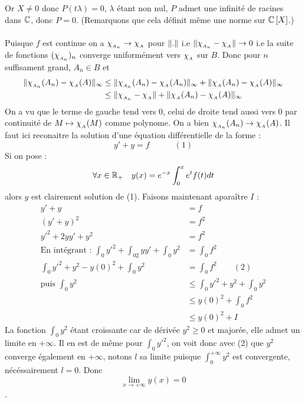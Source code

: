 \documentclass[letterpaper,10pt]{article}
\begin{document}
{Or $X \neq 0$ donc $P(t\lambda) =0$, $\lambda$ étant non nul, $P$ admet une infinité de racines dans $\mathbb{C}$, donc $P=0$. (Remarquons que cela définit même une norme sur $\mathbb{C}\left[X\right] $.)\\
\\
Puisque $f$ est continue on a $\chi_{_{A_n}} \to \chi_{_{A}}$ pour $\|.\|$ i.e $\|\chi_{_{A_n}}-\chi_{_{A}}\| \to 0$ i.e la suite de fonctions $(\chi_{_{A_n}})_n$ converge uniformément vers $\chi_{_{A}}$ sur $B$. Donc pour $n$ suffisament grand, $A_n\in B $ et \begin{align*}\|\chi_{_{A_n}}(A_n)-\chi_{_{A}}(A)\|_{\infty} &\leq \|\chi_{_{A_n}}(A_n)-\chi_{_{A}}(A_n)\|_{\infty} + \|\chi_{_{A}}(A_n)-\chi_{_{A}}(A)\|_{\infty}\\ &\leq \|\chi_{_{A_n}}-\chi_{_{A}}\| + \|\chi_{_{A}}(A_n)-\chi_{_{A}}(A)\|_{\infty} \end{align*}
On a vu que le terme de gauche tend vers 0, celui de droite tend aussi vers 0 par continuité de $M\mapsto \chi_{_{A}}(M)$ comme polynome.
On a bien $\chi_{_{A_n}}(A_n) \to \chi_{_{A}}(A)$. 
}
{
Il faut ici reconaitre la solution d'une équation différentielle de la forme : \[ y' + y = f \quad\quad\quad (1)\] Si on pose : \[\forall x \in \mathbb{R}_+ \quad y(x) = e^{-x}\int_0^xe^tf(t)dt \] alors $y$ est clairement solution de  (1). Faisons maintenant aparaître $I$ : \begin{align*}
y'+y &= f \\
(y'+y)^2 &= f^2\\ 
y'^2 + 2yy' + y^2 &= f^2 \\
\text{En intégrant : } \int_0y'^2 + \int_02yy' +\int_0y^2 &= \int_0 f^2\\
\int_0y'^2 + y^2-y(0)^2 + \int_0 y^2 &= \int_0f^2 \quad\quad (2)\\ \text{puis } \int_0 y^2 &\leq \int_0 y'^2 + y^2 + \int_0 y^2\\
&\leq y(0)^2 + \int_0 f^2\\ &\leq y(0)^2 +I
\end{align*}
La fonction $\int_0y^2$ étant croissante car de dérivée $y^2 \geq 0$ et majorée, elle admet un limite en $+\infty$. Il en est de même pour $\int_0y'^2$, on voit donc avec (2) que $y^2$
 converge également en $+\infty$, notons $l$ sa limite puisque $\int_0^{+\infty}y^2$ est convergente, nécéssairement $l=0$. Donc \[ \lim_{x\to+\infty}y(x) =0\].
}

\printbibliography %
\end{document}
